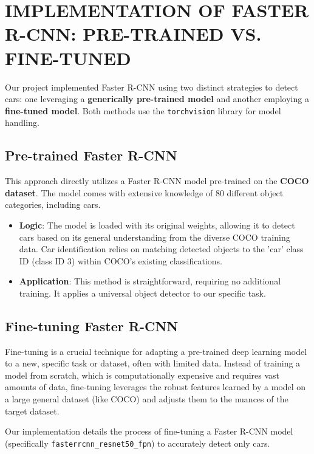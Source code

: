 \documentclass[conference]{IEEEtran}
\begin{document}
\section{\uppercase{Implementation of Faster R-CNN: Pre-trained vs. Fine-tuned}} 
\label{sec:fasterrcnn_implementations}

Our project implemented Faster R-CNN using two distinct strategies to detect cars: one leveraging a \textbf{generically pre-trained model} and another employing a \textbf{fine-tuned model}. Both methods use the \texttt{torchvision} library for model handling.

\subsection{Pre-trained Faster R-CNN}
\label{ssec:pretrained_fasterrcnn_impl} 
This approach directly utilizes a Faster R-CNN model pre-trained on the \textbf{COCO dataset}. The model comes with extensive knowledge of 80 different object categories, including cars.

\begin{itemize}
    \item \textbf{Logic}: The model is loaded with its original weights, allowing it to detect cars based on its general understanding from the diverse COCO training data. Car identification relies on matching detected objects to the 'car' class ID (class ID 3) within COCO's existing classifications.
    \item \textbf{Application}: This method is straightforward, requiring no additional training. It applies a universal object detector to our specific task.
\end{itemize}

\subsection{Fine-tuning Faster R-CNN}
\label{ssec:fasterrcnn_finetuning_impl} 

Fine-tuning is a crucial technique for adapting a pre-trained deep learning model to a new, specific task or dataset, often with limited data. Instead of training a model from scratch, which is computationally expensive and requires vast amounts of data, fine-tuning leverages the robust features learned by a model on a large general dataset (like COCO) and adjusts them to the nuances of the target dataset.

Our implementation details the process of fine-tuning a Faster R-CNN model (specifically \texttt{fasterrcnn\_resnet50\_fpn}) to accurately detect only cars.
\end{document}
